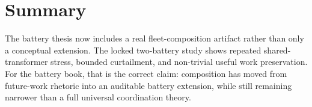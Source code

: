 \section{Summary}

The battery thesis now includes a real fleet-composition artifact rather than
only a conceptual extension.  The locked two-battery study shows repeated
shared-transformer stress, bounded curtailment, and non-trivial useful work
preservation.  For the battery book, that is the correct claim: composition
has moved from future-work rhetoric into an auditable battery extension, while
still remaining narrower than a full universal coordination theory.
